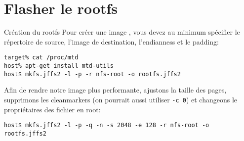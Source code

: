 

\section{Flasher le rootfs}

\begin{frame}[fragile=singleslide]{Création du rootfs}
  Pour créer une image , vous devez au minimum spécifier le
  répertoire  de source,  l'image de  destination, l'endianness  et le
  padding:
  \begin{lstlisting} 
target% cat /proc/mtd
host% apt-get install mtd-utils
host$ mkfs.jffs2 -l -p -r nfs-root -o rootfs.jffs2
  \end{lstlisting}
  Afin de rendre notre image  plus performante, ajustons la taille des
  pages,  supprimons  les  cleanmarkers  (on pourrait  aussi  utiliser
  \verb+-c 0+) et changeons le propriétaires des fichier en root:
  \begin{lstlisting} 
host$ mkfs.jffs2 -l -p -q -n -s 2048 -e 128 -r nfs-root -o rootfs.jffs2
  \end{lstlisting}
\end{frame}

